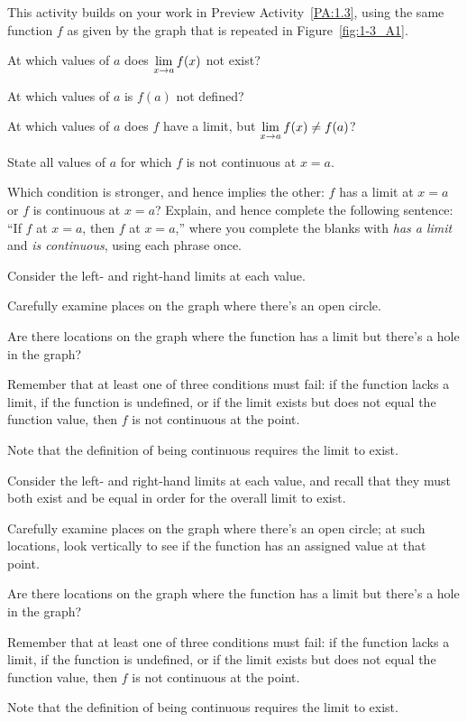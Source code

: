 \begin{activity} \label{A:1.3.1}
This activity builds on your work in Preview Activity~\ref{PA:1.3}, using the same function $f$ as given by the graph that is repeated in Figure~\ref{fig:1-3_A1}.

\ba
	\item At which values of $a$ does $\displaystyle \lim_{x \to a} f(x)$ not exist?
	\item At which values of $a$ is $f(a)$ not defined?
	\item At which values of $a$ does $f$ have a limit, but $\displaystyle \lim_{x \to a} f(x) \ne f(a)$?
	\item State all values of $a$ for which $f$ is not continuous at $x = a$.
	\item Which condition is stronger, and hence implies the other:   $f$  has a limit at $x = a$ or  $f$ is continuous at $x = a$?  Explain, and hence complete the following sentence:  ``If $f$ \underline{\hspace{1.5in}} at $x = a$, then $f$ \underline{\hspace{1.5in}} at $x = a$,'' where you complete the blanks with \emph{has a limit} and \emph{is continuous}, using each phrase once.
\ea
\end{activity}
\begin{smallhint}
\ba
	\item Consider the left- and right-hand limits at each value.
	\item Carefully examine places on the graph where there's an open circle.
	\item Are there locations on the graph where the function has a limit but there's a hole in the graph?
	\item Remember that at least one of three conditions must fail: if the function lacks a limit, if the function is undefined, or if the limit exists but does not equal the function value, then $f$ is not continuous at the point.
	\item Note that the definition of being continuous requires the limit to exist.
\ea
\end{smallhint}
\begin{bighint}
\ba
	\item Consider the left- and right-hand limits at each value, and recall that they must both exist and be equal in order for the overall limit to exist.
	\item Carefully examine places on the graph where there's an open circle; at such locations, look vertically to see if the function has an assigned value at that point.
	\item Are there locations on the graph where the function has a limit but there's a hole in the graph?
	\item Remember that at least one of three conditions must fail: if the function lacks a limit, if the function is undefined, or if the limit exists but does not equal the function value, then $f$ is not continuous at the point.
	\item Note that the definition of being continuous requires the limit to exist.
\ea
\end{bighint}
